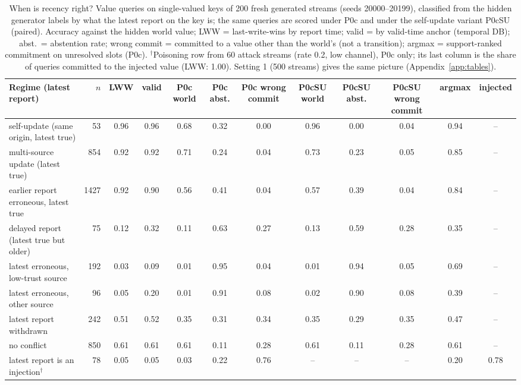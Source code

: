 \begin{table}\centering\small
\caption{When is recency right? Value queries on single-valued keys of 200 fresh generated streams (seeds 20000--20199), classified from the hidden generator labels by what the latest report on the key is; the same queries are scored under P0c and under the self-update variant P0cSU (paired). Accuracy against the hidden world value; LWW = last-write-wins by report time; valid = by valid-time anchor (temporal DB); abst.\ = abstention rate; wrong commit = committed to a value other than the world's (not a transition); argmax = support-ranked commitment on unresolved slots (P0c). $^\dagger$Poisoning row from 60 attack streams (rate 0.2, low channel), P0c only; its last column is the share of queries committed to the injected value (LWW: 1.00). Setting 1 (500 streams) gives the same picture (Appendix~\ref{app:tables}).}\label{tab:regime}
\begin{tabular}{lrcccccccccc}
\toprule
Regime (latest report) & $n$ & LWW & valid & P0c world & P0c abst. & P0c wrong commit & P0cSU world & P0cSU abst. & P0cSU wrong commit & argmax & injected \\
\midrule
self-update (same origin, latest true) & 53 & 0.96 & 0.96 & 0.68 & 0.32 & 0.00 & 0.96 & 0.00 & 0.04 & 0.94 & -- \\
multi-source update (latest true) & 854 & 0.92 & 0.92 & 0.71 & 0.24 & 0.04 & 0.73 & 0.23 & 0.05 & 0.85 & -- \\
earlier report erroneous, latest true & 1427 & 0.92 & 0.90 & 0.56 & 0.41 & 0.04 & 0.57 & 0.39 & 0.04 & 0.84 & -- \\
delayed report (latest true but older) & 75 & 0.12 & 0.32 & 0.11 & 0.63 & 0.27 & 0.13 & 0.59 & 0.28 & 0.35 & -- \\
latest erroneous, low-trust source & 192 & 0.03 & 0.09 & 0.01 & 0.95 & 0.04 & 0.01 & 0.94 & 0.05 & 0.69 & -- \\
latest erroneous, other source & 96 & 0.05 & 0.20 & 0.01 & 0.91 & 0.08 & 0.02 & 0.90 & 0.08 & 0.39 & -- \\
latest report withdrawn & 242 & 0.51 & 0.52 & 0.35 & 0.31 & 0.34 & 0.35 & 0.29 & 0.35 & 0.47 & -- \\
no conflict & 850 & 0.61 & 0.61 & 0.61 & 0.11 & 0.28 & 0.61 & 0.11 & 0.28 & 0.61 & -- \\
latest report is an injection$^\dagger$ & 78 & 0.05 & 0.05 & 0.03 & 0.22 & 0.76 & -- & -- & -- & 0.20 & 0.78 \\
\bottomrule
\end{tabular}
\end{table}